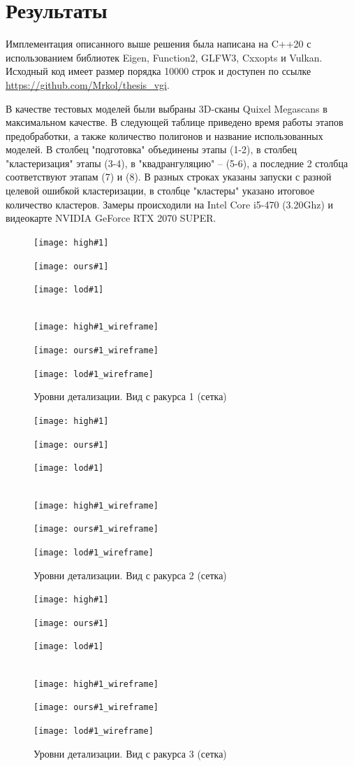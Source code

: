 \documentclass[12pt]{extarticle}
\begin{document}
\section{Результаты}
Имплементация описанного выше решения была написана на C++20 с использованием библиотек Eigen, Function2, GLFW3, Cxxopts и Vulkan. Исходный код имеет размер порядка 10000 строк и доступен по ссылке \url{https://github.com/Mrkol/thesis_vgi}.

В качестве тестовых моделей были выбраны 3D-сканы Quixel Megascans \cite{quixel_megascans} в максимальном качестве. В следующей таблице приведено время работы этапов предобработки, а также количество полигонов и название использованных моделей. В столбец "подготовка" объединены этапы (1-2), в столбец "кластеризация" этапы (3-4), в "квадрангуляцию" -- (5-6), а последние 2 столбца соответствуют этапам (7) и (8). В разных строках указаны запуски с разной целевой ошибкой кластеризации, в столбце "кластеры" указано итоговое количество кластеров. Замеры происходили на Intel Core i5-470 (3.20Ghz) и видеокарте NVIDIA GeForce RTX 2070 SUPER.

\newcommand{\showpreviews}[1]{
  \begin{figure}
    \minipage{0.32\textwidth}
      \centering
      \texttt{[image: high\#1]}
      \caption{Оригинальная модель. Вид с ракурса #1}
      \label{fig:preview#1start}
    \endminipage\hfill
    \minipage{0.32\textwidth}
      \centering
      \texttt{[image: ours\#1]}
      \caption{Предлагаемый метод. Вид с ракурса #1}
    \endminipage\hfill
    \minipage{0.32\textwidth}
      \centering
      \texttt{[image: lod\#1]}
      \caption{Уровни детализации. Вид с ракурса #1}
    \endminipage
    \\
    \minipage{0.32\textwidth}
      \centering
      \texttt{[image: high\#1\_wireframe]}
      \caption{Оригинальная модель. Вид с ракурса #1 (сетка)}
    \endminipage\hfill
    \minipage{0.32\textwidth}
      \centering
      \texttt{[image: ours\#1\_wireframe]}
      \caption{Предлагаемый метод. Вид с ракурса #1 (сетка)}
    \endminipage\hfill
    \minipage{0.32\textwidth}
      \centering
      \texttt{[image: lod\#1\_wireframe]}
      \caption{Уровни детализации. Вид с ракурса #1 (сетка)}
      \label{fig:preview#1end}
    \endminipage
  \end{figure}
}

\showpreviews{1}
\showpreviews{2}
\showpreviews{3}
\end{document}
